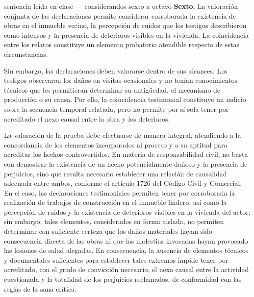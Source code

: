 \documentclass[12pt,oneside]{book}
\begin{document}
\begin{example}{sentencia le\'ida en clase --- considerandos sexto a octavo}
\textbf{Sexto.} La valoraci\'on conjunta de las declaraciones permite considerar corroborada la existencia de obras en el inmueble vecino, la percepci\'on de ruidos que los testigos describieron como intensos y la presencia de deterioros visibles en la vivienda. La coincidencia entre los relatos constituye un elemento probatorio atendible respecto de estas circunstancias.

Sin embargo, las declaraciones deben valorarse dentro de sus alcances. Los testigos observaron los da\~nos en visitas ocasionales y no ten\'ian conocimientos t\'ecnicos que les permitieran determinar su antig\"uedad, el mecanismo de producci\'on o su causa. Por ello, la coincidencia testimonial constituye un indicio sobre la secuencia temporal relatada, pero no permite por s\'i sola tener por acreditado el nexo causal entre la obra y los deterioros.

La valoraci\'on de la prueba debe efectuarse de manera integral, atendiendo a la concordancia de los elementos incorporados al proceso y a su aptitud para acreditar los hechos controvertidos. En materia de responsabilidad civil, no basta con demostrar la existencia de un hecho potencialmente da\~noso y la presencia de perjuicios, sino que resulta necesario establecer una relaci\'on de causalidad adecuada entre ambos, conforme el art\'iculo 1726 del C\'odigo Civil y Comercial. En el caso, las declaraciones testimoniales permiten tener por corroborada la realizaci\'on de trabajos de construcci\'on en el inmueble lindero, as\'i como la percepci\'on de ruidos y la existencia de deterioros visibles en la vivienda del actor; sin embargo, tales elementos, considerados en forma aislada, no permiten determinar con suficiente certeza que los da\~nos materiales hayan sido consecuencia directa de las obras ni que las molestias invocadas hayan provocado las lesiones de salud alegadas. En consecuencia, la ausencia de elementos t\'ecnicos y documentales suficientes para establecer tales extremos impide tener por acreditado, con el grado de convicci\'on necesario, el nexo causal entre la actividad cuestionada y la totalidad de los perjuicios reclamados, de conformidad con las reglas de la sana cr\'itica.


\end{example}
\end{document}
